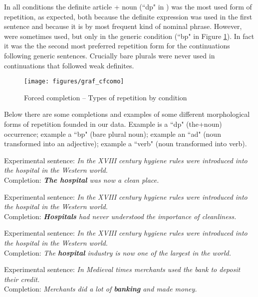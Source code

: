 \documentclass[output=paper,
modfonts
]{langscibook}
\begin{document}
In all conditions the definite article + noun (“dp" in ) was the most used form of repetition, as expected, both because the definite expression was used in the first sentence and because it is by most frequent kind of nominal phrase. However,  were sometimes used, but only in the generic condition (“bp" in Figure \ref{fig:desaetal:11}). In fact it was the the second most preferred repetition form for the continuations following generic sentences. Crucially bare plurals were never used in continuations that followed weak definites.


\begin{figure}[H]
\centering
\texttt{[image: figures/graf\_cfcomo]}
\caption{Forced completion -- Types of repetition by condition}
\label{fig:desaetal:11}
\end{figure}

Below there are some completions and examples of some different morphological forms of repetition founded in our data. Example  is a “dp" (the+noun) occurrence; example  a “bp" (bare plural noun); example  an “ad" (noun transformed into an adjective); example  a “verb" (noun transformed into verb).

\ea \label{ex:desaetal:17}
{Experimental sentence:} \textit{In the XVIII century hygiene rules were introduced into the	hospital in the Western world.}
\\ {Completion:} \textit{\textbf{The hospital} was now a clean place.} 
\z

\ea\label{ex:desaetal:18}
{Experimental sentence:} \textit{In the XVIII century hygiene rules were introduced into the hospital in the Western world.}
\\ {Completion:} \textit{\textbf{Hospitals} had never understood the importance of cleanliness.} 
\z

\ea \label{ex:desaetal:19}
{Experimental sentence:} \textit{In the XVIII century hygiene rules were introduced into the hospital in the Western world.}
\\ {Completion:} \textit{The \textbf{hospital} industry is now one of the largest in the world.} 
\z

\ea \label{ex:desaetal:20}
{Experimental sentence:} \textit{In Medieval times merchants used the bank to deposit their credit.}\largerpage
\\ {Completion:} \textit{Merchants did a lot of  \textbf{banking} and made money.} 
\z
\end{document}
